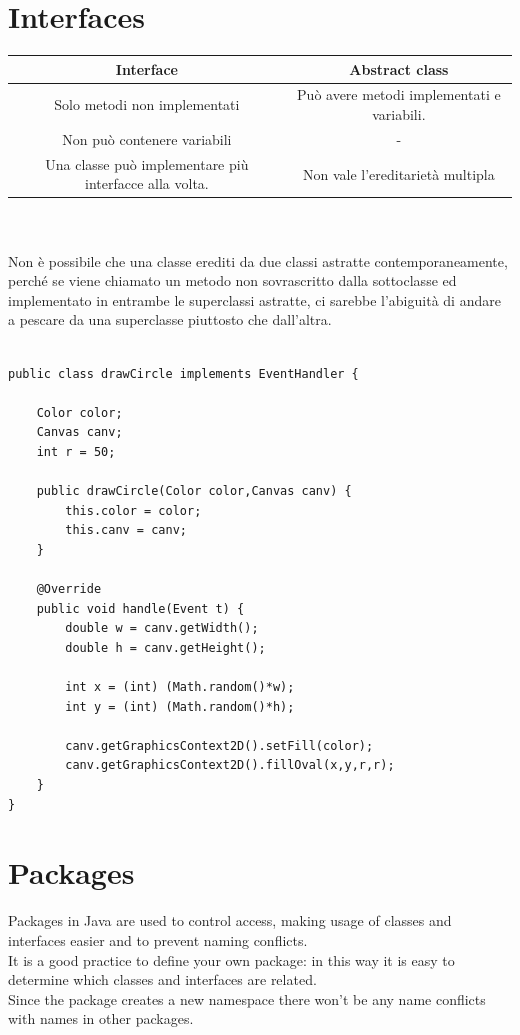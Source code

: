 \documentclass[10pt,a4paper]{book}
\begin{document}
\section{Interfaces}
\begin{tabular}{|c|c|}
\hline 
Interface & Abstract class \\ 
\hline 
Solo metodi non implementati & Può avere metodi implementati e variabili.\\
Non può contenere variabili & -\\
Una classe può implementare più interfacce alla volta. & Non vale l'ereditarietà multipla\\
\hline 
\end{tabular} 
\\\\
Non è possibile che una classe erediti da due classi astratte contemporaneamente, perché se viene chiamato un metodo non sovrascritto dalla sottoclasse ed implementato in entrambe le superclassi astratte, ci sarebbe l'abiguità di andare a pescare da una superclasse piuttosto che dall'altra.
\\\\
\begin{verbatim}
public class drawCircle implements EventHandler {

    Color color;
    Canvas canv;
    int r = 50;
    
    public drawCircle(Color color,Canvas canv) {
        this.color = color;
        this.canv = canv;
    }
    
    @Override
    public void handle(Event t) {
        double w = canv.getWidth();
        double h = canv.getHeight();
        
        int x = (int) (Math.random()*w);
        int y = (int) (Math.random()*h);
        
        canv.getGraphicsContext2D().setFill(color);
        canv.getGraphicsContext2D().fillOval(x,y,r,r);
    }
} 

\end{verbatim}
\newpage
\section{Packages}
Packages in Java are used to control access, making usage of classes and interfaces easier and to prevent naming conflicts.\\
It is a good practice to define your own package: in this way it is easy to determine which classes and interfaces are related.\\
Since the package creates a new namespace there won't be any name conflicts with names in other packages. 
\newpage
\end{document}
